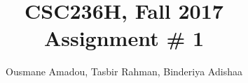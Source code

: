 \documentclass[12pt]{article}
\begin{document}

\title{CSC236H, Fall 2017 \\
Assignment \# 1}
\author{Ousmane Amadou, Tasbir Rahman, Binderiya Adishaa }

\maketitle
\end{document}
